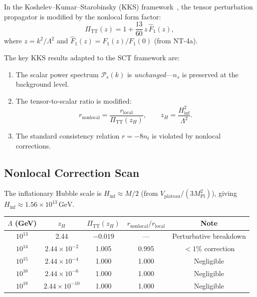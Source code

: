 \documentclass[11pt,a4paper]{article}
\theoremstyle{plain}
\theoremstyle{definition}
\begin{document}
In the Koshelev--Kumar--Starobinsky (KKS)
framework~\cite{KKS20,KKS22,KKMS20}, the tensor perturbation
propagator is modified by the nonlocal form factor:
\begin{equation}\label{eq:Pi-TT}
  \Pi_{\mathrm{TT}}(z)
  = 1 + \frac{13}{60}\,z\,\hat{F}_1(z),
\end{equation}
where $z = k^2/\Lambda^2$ and $\hat{F}_1(z) = F_1(z)/F_1(0)$
(from NT-4a).

The key KKS results adapted to the SCT framework are:
\begin{enumerate}[nosep]
  \item The scalar power spectrum $\mathcal{P}_s(k)$ is
    \emph{unchanged}---$n_s$ is preserved at the background level.
  \item The tensor-to-scalar ratio is modified:
    \begin{equation}\label{eq:r-nonlocal}
      r_{\mathrm{nonlocal}}
      = \frac{r_{\mathrm{local}}}{\Pi_{\mathrm{TT}}(z_H)},
      \qquad z_H = \frac{H_{\mathrm{inf}}^2}{\Lambda^2}.
    \end{equation}
  \item The standard consistency relation $r = -8n_t$ is violated by
    nonlocal corrections.
\end{enumerate}

\subsection{Nonlocal Correction Scan}

The inflationary Hubble scale is $H_{\mathrm{inf}} \approx M/2$
(from $V_{\mathrm{plateau}} / (3M_{\mathrm{Pl}}^2)$), giving
$H_{\mathrm{inf}} \approx 1.56 \times 10^{13}\,\mathrm{GeV}$.

\begin{center}
\begin{tabular}{ccccc}
\toprule
$\Lambda$ (GeV) & $z_H$ & $\Pi_{\mathrm{TT}}(z_H)$
  & $r_{\mathrm{nonlocal}}/r_{\mathrm{local}}$ & Note \\
\midrule
$10^{13}$ & 2.44 & $-0.019$ & --- & Perturbative breakdown \\
$10^{14}$ & $2.44 \times 10^{-2}$ & 1.005 & 0.995 & $<1$\% correction \\
$10^{15}$ & $2.44 \times 10^{-4}$ & 1.000 & 1.000 & Negligible \\
$10^{16}$ & $2.44 \times 10^{-6}$ & 1.000 & 1.000 & Negligible \\
$10^{18}$ & $2.44 \times 10^{-10}$ & 1.000 & 1.000 & Negligible \\
\bottomrule
\end{tabular}
\end{center}
\end{document}
